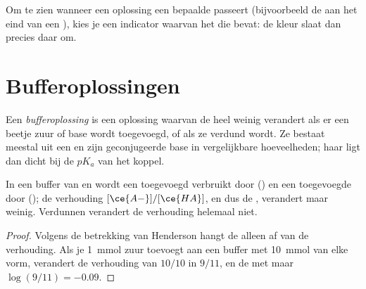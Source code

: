 \begin{method}\label{met:g12:buffers-predominance:indicator}
Om te zien wanneer een oplossing een bepaalde  passeert (bijvoorbeeld
de  aan het eind van een ), kies je een indicator waarvan het
 die  bevat: de kleur slaat dan precies daar om.
\end{method}

\section{Bufferoplossingen}

\begin{definition}[Bufferoplossing]\label{def:g12:buffers-predominance:buffer}
Een \emph{bufferoplossing} is een oplossing
waarvan de  heel weinig verandert als er een beetje zuur of base wordt
toegevoegd, of als ze verdund wordt. Ze bestaat meestal uit een 
en zijn geconjugeerde base in vergelijkbare hoeveelheden; haar  ligt
dan dicht bij de $pK_a$ van het koppel.
\end{definition}

\begin{proposition}\label{prop:g12:buffers-predominance:buffer}
In een buffer van  en  wordt een toegevoegd 
verbruikt door
 () en een toegevoegde  door
 (); de verhouding $[\ce{A-}]/[\ce{HA}]$,
en dus de , verandert maar weinig. Verdunnen verandert de verhouding
helemaal niet.
\end{proposition}

\begin{proof}
Volgens de betrekking van Henderson hangt de  alleen af van de
verhouding. Als je \qty{1}{mmol} zuur toevoegt aan een buffer met
\qty{10}{mmol} van elke vorm, verandert de verhouding van $10/10$ in
$9/11$, en de  met maar
$\log(9/11) = -0.09$.
\end{proof}

